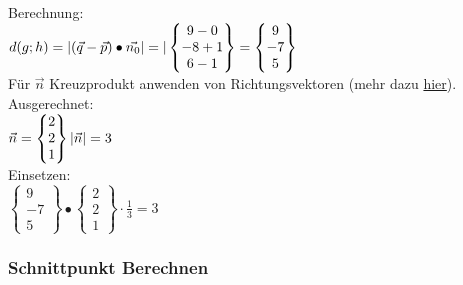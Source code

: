 Berechnung: \\
$
d(g; h) = |(\vec{q} - \vec{p}) \bullet \vec{n_0}| \\
 = |
 \begin{Bmatrix}
    9 - 0 \\ -8 + 1 \\ 6 - 1
 \end{Bmatrix}
 = 
 \begin{Bmatrix}
    9 \\ -7 \\ 5
 \end{Bmatrix}
$
\\
Für $\vec{n}$ Kreuzprodukt anwenden von Richtungsvektoren (mehr dazu \hyperref[sec:kreuzprodukt]{hier}). \\
Ausgerechnet: \\
$
\vec{n} = 
\begin{Bmatrix}
    2 \\ 2 \\ 1
\end{Bmatrix}
\\
|\vec{n}| = 3
$
\\
Einsetzen: \\
$
\begin{Bmatrix}
    9 \\ -7 \\ 5
\end{Bmatrix}
\bullet
\begin{Bmatrix}
    2 \\ 2 \\ 1
\end{Bmatrix}
\cdot \frac{1}{3}
= 
3
$

\subsubsection{Schnittpunkt Berechnen}
